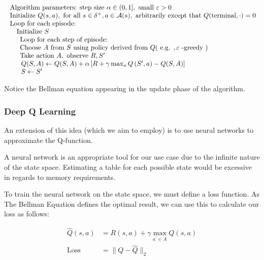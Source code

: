 \documentclass[12pt]{article}
\begin{document}
$$
\begin{array} { l } { \text { Algorithm parameters: step size } \alpha \in ( 0,1 ] , \text { small } \varepsilon > 0 } \\ { \text { Initialize } Q ( s , a ) , \text { for all } s \in \delta ^ { + } , a \in \mathcal { A } ( s ) , \text { arbitrarily except that } Q ( \text {terminal} , \cdot ) = 0 }  \\
\text{ Loop for each episode:} \\
\quad\text{ Initialize } S \\
\indent \text{ Loop for each step of episode:} \\
 \indent{ \text { Choose } A \text { from } S \text { using policy derived from } Q ( \text { e.g. } , \varepsilon \text { -greedy } ) } \\ \indent{ \text { Take action } A , \text { observe } R , S ^ { \prime } } \\ \indent { \hphantom{1}Q ( S , A ) \leftarrow Q ( S , A ) + \alpha \left[ R + \gamma \max _ { a } Q \left( S ^ { \prime } , a \right) - Q ( S , A ) \right] } \\ \indent{ \hphantom{1} S \leftarrow S ^ { \prime } }\\
\end{array}
$$ 


Notice the Bellman equation appearing in the update phase of the algorithm.

\subsubsection{Deep Q Learning}
An extension of this idea (which we aim to employ) is to use neural networks to approximate the Q-function.

A neural network is an appropriate tool for our use case due to the infinite nature of the state space. Estimating a table for each possible state would be excessive in regards to memory requirements.

To train the neural network on the state space, we must define a loss function. As The Bellman Equation defines the optimal result, we can use this to calculate our loss as follows:

$$
\begin{aligned}
\hat { Q } ( s , a ) &= R ( s , a ) + \gamma \max _ { a ^ { \prime } \in A } Q ( s , a ) \\
\text {Loss} &= \| Q - \hat { Q } \| _ { 2 }
\end{aligned}
$$
\end{document}
